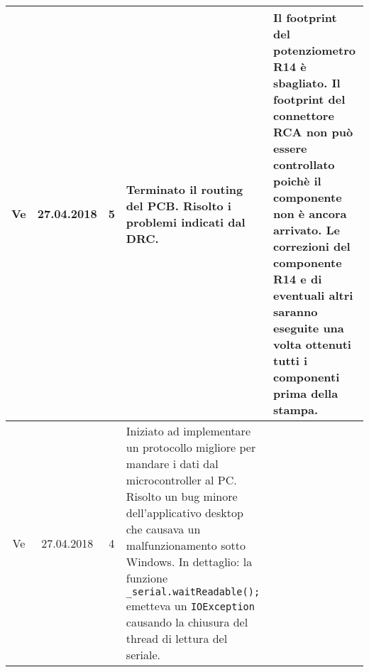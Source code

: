 \documentclass[a4paper]{article}
\newcommand{\journalentry}[5]{%
    #1 & #2 & #3 & #4 & #5 \\\hline
}
\begin{document}
\begin{tabularx}{\textwidth}{| c | c | c | p{} | X |}
        \journalentry{Ve}{27.04.2018}{5}{
            Terminato il routing del PCB.
            Risolto i problemi indicati dal DRC.
        }{
            Il footprint del potenziometro R14 \`e sbagliato.
            Il footprint del connettore RCA non pu\`o essere controllato poich\`e
            il componente non \`e ancora arrivato. Le correzioni del componente
            R14 e di eventuali altri saranno eseguite una volta ottenuti tutti
            i componenti prima della stampa.
        }

        \journalentry{Ve}{27.04.2018}{4}{
            Iniziato ad implementare un protocollo migliore per mandare i dati dal
            microcontroller al PC.
            Risolto un bug minore dell'applicativo desktop che causava un malfunzionamento
            sotto Windows. In dettaglio: la funzione \texttt{\_serial.waitReadable();}
            emetteva un \texttt{IOException} causando la chiusura del thread
            di lettura del seriale.
        }{

        }

    \end{tabularx}
\end{document}
